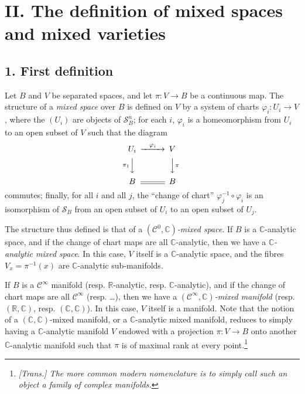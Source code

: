 \documentclass[british]{article}
\begin{document}
\section*{II. The definition of mixed spaces and mixed
varieties}\label{two-section-II}

\subsection*{1. First definition}\label{two-section-II.1}

Let \(B\) and \(V\) be separated spaces, and let \(\pi\colon V\to B\) be
a continuous map. The structure of a \emph{mixed space} over \(B\) is
defined on \(V\) by a system of charts \(\varphi_i\colon U_i\to V\),
where the \((U_i)\) are objects of \(\mathscr{S}_B^n\); for each \(i\),
\(\varphi_i\) is a homeomorphism from \(U_i\) to an open subset of \(V\)
such that the diagram \[
  \begin{CD}
    U_i @>{\varphi_i}>> V
  \\@V{\pi_1}VV @VV{\pi}V
  \\B @= B
  \end{CD}
\] commutes; finally, for all \(i\) and all \(j\), the ``change of
chart'' \(\varphi_j^{-1}\circ\varphi_i\) is an isomorphism of
\(\mathscr{S}_B\) from an open subset of \(U_i\) to an open subset of
\(U_j\).

The structure thus defined is that of a
\emph{\((\mathscr{C}^0,\mathbb{C})\)-mixed space}. If \(B\) is a
\(\mathbb{C}\)-analytic space, and if the change of chart maps are all
\(\mathbb{C}\)-analytic, then we have a \emph{\(\mathbb{C}\)-analytic
mixed space}. In this case, \(V\) itself is a \(\mathbb{C}\)-analytic
space, and the fibres \(V_x=\pi^{-1}(x)\) are \(\mathbb{C}\)-analytic
sub-manifolds.

If \(B\) is a \(\mathscr{C}^\infty\) manifold (resp.
\(\mathbb{R}\)-analytic, resp. \(\mathbb{C}\)-analytic), and if the
change of chart maps are all \(\mathscr{C}^\infty\) (resp. \ldots), then
we have a \emph{\((\mathscr{C}^\infty,\mathbb{C})\)-mixed manifold}
(resp. \((\mathbb{R},\mathbb{C})\), resp. \((\mathbb{C},\mathbb{C})\)).
In this case, \(V\) itself is a manifold. Note that the notion of a
\((\mathbb{C},\mathbb{C})\)-mixed manifold, or a \(\mathbb{C}\)-analytic
mixed manifold, reduces to simply having a \(\mathbb{C}\)-analytic
manifold \(V\) endowed with a projection \(\pi\colon V\to B\) onto
another \(\mathbb{C}\)-analytic manifold such that \(\pi\) is of maximal
rank at every point.\footnote{\emph{{[}Trans.{]} The more common modern
  nomenclature is to simply call such an object a family of complex
  manifolds.}}
\end{document}
